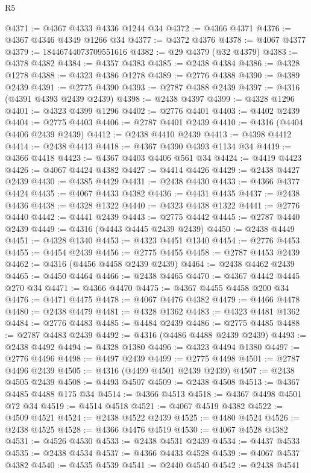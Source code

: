 \begin{lexlean}{R5}
\begin{coremodule}
@4371 := @4367 @4333 @4336 @1244 @34
@4372 := @4366 @4371
@4376 := @4367 @4346 @4349 @1266 @34
@4377 := @4372 @4376
@4378 := @4067 @4377
@4379 := 18446744073709551616
@4382 := @29 @4379 (@32 @4379)
@4383 := @4378 @4382
@4384 := @4357 @4383
@4385 := @2438 @4384
@4386 := @4328 @1278
@4388 := @4323 @4386 @1278
@4389 := @2776 @4388
@4390 := @4389 @2439
@4391 := @2775 @4390
@4393 := @2787 @4388 @2439
@4397 := @4316 (@4391 @4393 @2439 @2439)
@4398 := @2438 @4397
@4399 := @4328 @1296
@4401 := @4323 @4399 @1296
@4402 := @2776 @4401
@4403 := @4402 @2439
@4404 := @2775 @4403
@4406 := @2787 @4401 @2439
@4410 := @4316 (@4404 @4406 @2439 @2439)
@4412 := @2438 @4410 @2439
@4413 := @4398 @4412
@4414 := @2438 @4413
@4418 := @4367 @4390 @4393 @1134 @34
@4419 := @4366 @4418
@4423 := @4367 @4403 @4406 @561 @34
@4424 := @4419 @4423
@4426 := @4067 @4424 @4382
@4427 := @4414 @4426
@4429 := @2438 @4427 @2439
@4430 := @4385 @4429
@4431 := @2438 @4430
@4433 := @4366 @4377 @4424
@4435 := @4067 @4433 @4382
@4436 := @4431 @4435
@4437 := @2438 @4436
@4438 := @4328 @1322
@4440 := @4323 @4438 @1322
@4441 := @2776 @4440
@4442 := @4441 @2439
@4443 := @2775 @4442
@4445 := @2787 @4440 @2439
@4449 := @4316 (@4443 @4445 @2439 @2439)
@4450 := @2438 @4449
@4451 := @4328 @1340
@4453 := @4323 @4451 @1340
@4454 := @2776 @4453
@4455 := @4454 @2439
@4456 := @2775 @4455
@4458 := @2787 @4453 @2439
@4462 := @4316 (@4456 @4458 @2439 @2439)
@4464 := @2438 @4462 @2439
@4465 := @4450 @4464
@4466 := @2438 @4465
@4470 := @4367 @4442 @4445 @270 @34
@4471 := @4366 @4470
@4475 := @4367 @4455 @4458 @200 @34
@4476 := @4471 @4475
@4478 := @4067 @4476 @4382
@4479 := @4466 @4478
@4480 := @2438 @4479
@4481 := @4328 @1362
@4483 := @4323 @4481 @1362
@4484 := @2776 @4483
@4485 := @4484 @2439
@4486 := @2775 @4485
@4488 := @2787 @4483 @2439
@4492 := @4316 (@4486 @4488 @2439 @2439)
@4493 := @2438 @4492
@4494 := @4328 @1380
@4496 := @4323 @4494 @1380
@4497 := @2776 @4496
@4498 := @4497 @2439
@4499 := @2775 @4498
@4501 := @2787 @4496 @2439
@4505 := @4316 (@4499 @4501 @2439 @2439)
@4507 := @2438 @4505 @2439
@4508 := @4493 @4507
@4509 := @2438 @4508
@4513 := @4367 @4485 @4488 @175 @34
@4514 := @4366 @4513
@4518 := @4367 @4498 @4501 @72 @34
@4519 := @4514 @4518
@4521 := @4067 @4519 @4382
@4522 := @4509 @4521
@4524 := @2438 @4522 @2439
@4525 := @4480 @4524
@4526 := @2438 @4525
@4528 := @4366 @4476 @4519
@4530 := @4067 @4528 @4382
@4531 := @4526 @4530
@4533 := @2438 @4531 @2439
@4534 := @4437 @4533
@4535 := @2438 @4534
@4537 := @4366 @4433 @4528
@4539 := @4067 @4537 @4382
@4540 := @4535 @4539
@4541 := @2440 @4540
@4542 := @2438 @4541

\end{coremodule}
\end{lexlean}
